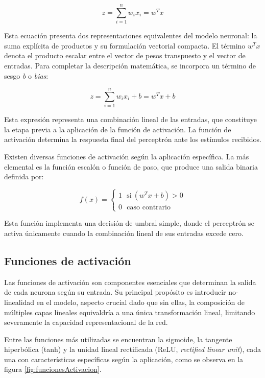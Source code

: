 \begin{equation}
z = \sum_{i=1}^{n} w_{i} x_{i} = w^{T}x
\end{equation}
%

Esta ecuación presenta dos representaciones equivalentes del modelo neuronal: la suma explícita de productos y su formulación vectorial compacta. El término \(w^{T}x\) denota el producto escalar entre el vector de pesos transpuesto y el vector de entradas. Para completar la descripción matemática, se incorpora un término de sesgo \textit{b} o \textit{bias}:
%

\begin{equation}
z = \sum_{i=1}^{n} w_{i} x_{i} + b = w^{T}x + b
\end{equation}
%

Esta expresión representa una combinación lineal de las entradas, que constituye la etapa previa a la aplicación de la función de activación. La función de activación determina la respuesta final del perceptrón ante los estímulos recibidos.
%

Existen diversas funciones de activación según la aplicación específica. La más elemental es la función escalón o función de paso, que produce una salida binaria definida por:
%

\begin{equation}
f(x)=\left\lbrace\begin{array}{c} 1~~~\text{si}~ (w^{T} x+b) > 0 \\ 0~~~\text{caso contrario} \end{array}\right.
\end{equation}
%

Esta función implementa una decisión de umbral simple, donde el perceptrón se activa únicamente cuando la combinación lineal de sus entradas excede cero.
%

\subsection{Funciones de activación}
%

Las funciones de activación son componentes esenciales que determinan la salida de cada neurona según su entrada. Su principal propósito es introducir no-linealidad en el modelo, aspecto crucial dado que sin ellas, la composición de múltiples capas lineales equivaldría a una única transformación lineal, limitando severamente la capacidad representacional de la red.
%

Entre las funciones más utilizadas se encuentran la sigmoide, la tangente hiperbólica (tanh) y la unidad lineal rectificada (ReLU, \textit{rectified linear unit}), cada una con características específicas según la aplicación, como se observa en la figura \ref{fig:funcionesActivacion}.
%

